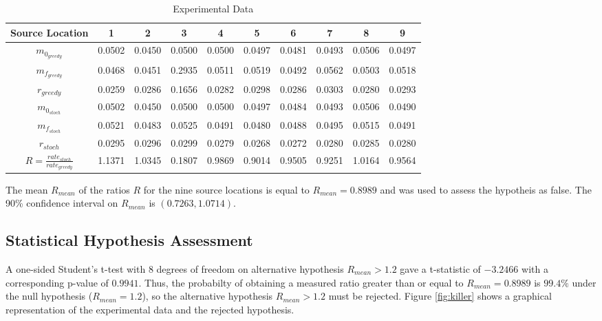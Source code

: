 \documentclass[submit]{aiaa-pretty-modified}
\begin{document}
\begin{table}[htb]
\begin{center}
\begin{tabular}{|c||c||c||c||c||c||c||c||c||c|}
\hline
 Source Location & 1 & 2 & 3 & 4 & 5 & 6 & 7 & 8 & 9 \\
\hline \hline
$m_{0_{greedy}}$ & 0.0502 & 0.0450 & 0.0500 & 0.0500 & 0.0497 & 0.0481 & 0.0493 & 0.0506 & 0.0497 \\
\hline
$m_{f_{greedy}}$ & 0.0468 & 0.0451 & 0.2935 & 0.0511 & 0.0519 & 0.0492 & 0.0562 & 0.0503 & 0.0518 \\
\hline
$r_{greedy}$ & 0.0259 & 0.0286 & 0.1656 & 0.0282 & 0.0298 & 0.0286 & 0.0303 & 0.0280 & 0.0293 \\
\hline
$m_{0_{stoch}}$ & 0.0502 & 0.0450 & 0.0500 & 0.0500 & 0.0497 & 0.0484 & 0.0493 & 0.0506 & 0.0490 \\
\hline
$m_{f_{stoch}}$ & 0.0521 & 0.0483 & 0.0525 & 0.0491 & 0.0480 & 0.0488 & 0.0495 & 0.0515 & 0.0491 \\
\hline
$r_{stoch}$ & 0.0295 & 0.0296 & 0.0299 & 0.0279 & 0.0268 & 0.0272 & 0.0280 & 0.0285 & 0.0280 \\
\hline
\hline
$R = \frac{rate_{stoch}}{rate_{greedy}}$  & 1.1371 & 1.0345 & 0.1807 & 0.9869 &
0.9014 & 0.9505  & 0.9251 & 1.0164 & 0.9564\\
\hline
\end{tabular}
\caption{Experimental Data \label{tab:data} }
\end{center}
\end{table}

The mean $R_{mean}$ of the ratios $R$ for the nine source locations is equal to
$R_{mean} = 0.8989$ and was used to assess the hypotheis as false. The
90\% confidence interval on $R_{mean}$ is $(0.7263, 1.0714)$.

\subsection{Statistical Hypothesis Assessment}
A one-sided Student's t-test with 8 degrees of freedom on alternative
hypothesis $R_{mean} > 1.2$ gave a t-statistic of $-3.2466$ with a
corresponding p-value of $0.9941$.  Thus, the probabilty of
obtaining a measured ratio greater than or equal to $R_{mean} = 0.8989$
is $99.4\%$ under the null hypothesis ($R_{mean} = 1.2$), so the
alternative hypothesis $R_{mean} > 1.2$ must be rejected.  Figure
\ref{fig:killer} shows a graphical representation of the experimental
data and the rejected hypothesis.
\end{document}

